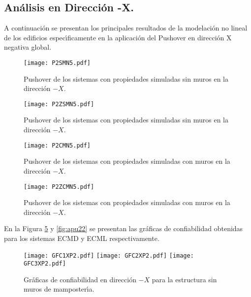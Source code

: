 \paragraph{}

\newpage

\subsection{An\'alisis en Direcci\'on -X.}

A continuaci\'on se presentan los principales resultados de la modelaci\'on no lineal de los edificios espec\'{\i}ficamente en la aplicaci\'on del Pushover en direcci\'on X negativa global.

\begin{figure} [htbp]
\texttt{[image: P2SMN5.pdf]}
\caption{Pushover de los sistemas con propiedades simuladas sin muros en la direcci\'on $-X$.}
\label{fig:apu17}
\end{figure}

\begin{figure} [htbp]
\texttt{[image: P2ZSMN5.pdf]}
\caption{Pushover de los sistemas con propiedades simuladas sin muros en la direcci\'on $-X$.}
\label{fig:apu18}
\end{figure}

\begin{figure} [htbp]
\texttt{[image: P2CMN5.pdf]}
\caption{Pushover de los sistemas con propiedades simuladas con muros en la direcci\'on $-X$.}
\label{fig:apu19}
\end{figure}

\begin{figure} [htbp]
\texttt{[image: P2ZCMN5.pdf]}
\caption{Pushover de los sistemas con propiedades simuladas con muros en la direcci\'on $-X$.}
\label{fig:apu20}
\end{figure}

En la Figura \ref{fig:apu21} y \ref{fig:apu22} se presentan las gr\'aficas de confiabilidad obtenidas para los sistemas ECMD y ECML respectivamente.

\newpage

\begin{figure} [htbp]
\centering
\texttt{[image: GFC1XP2.pdf]}
\texttt{[image: GFC2XP2.pdf]}
\texttt{[image: GFC3XP2.pdf]}
\caption{Gr\'aficas de confiabilidad en direcci\'on $-X$ para la estructura sin muros de mamposter\'{\i}a.}
\label{fig:apu21}
\end{figure}

